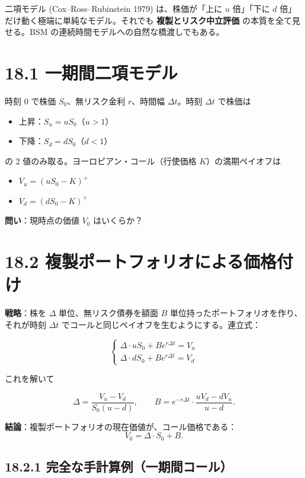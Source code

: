 \documentclass[11pt,a4paper]{report}
\begin{document}
二項モデル (Cox–Ross–Rubinstein 1979) は、株価が「上に $u$ 倍」「下に $d$ 倍」だけ動く極端に単純なモデル。それでも \textbf{複製とリスク中立評価} の本質を全て見せる。BSM の連続時間モデルへの自然な橋渡しでもある。

\section{18.1 一期間二項モデル}

時刻 0 で株価 $S_0$、無リスク金利 $r$、時間幅 $\Delta t$。時刻 $\Delta t$ で株価は

\begin{itemize}
\item 上昇：$S_u = u S_0$（$u > 1$）
\item 下降：$S_d = d S_0$（$d < 1$）
\end{itemize}

の 2 値のみ取る。ヨーロピアン・コール（行使価格 $K$）の満期ペイオフは

\begin{itemize}
\item $V_u = (u S_0 - K)^+$
\item $V_d = (d S_0 - K)^+$
\end{itemize}

\textbf{問い}：現時点の価値 $V_0$ はいくらか？

\section{18.2 複製ポートフォリオによる価格付け}

\textbf{戦略}：株を $\Delta$ 単位、無リスク債券を額面 $B$ 単位持ったポートフォリオを作り、それが時刻 $\Delta t$ でコールと同じペイオフを生むようにする。連立式：

\[ \begin{cases} \Delta \cdot u S_0 + B e^{r \Delta t} = V_u \\ \Delta \cdot d S_0 + B e^{r \Delta t} = V_d \end{cases} \]

これを解いて

\[ \Delta = \frac{V_u - V_d}{S_0 (u - d)}, \qquad B = e^{-r\Delta t} \cdot \frac{u V_d - d V_u}{u - d}. \]

\textbf{結論}：複製ポートフォリオの現在価値が、コール価格である： \[ V_0 = \Delta \cdot S_0 + B. \]

\subsection{18.2.1 完全な手計算例（一期間コール）}
\end{document}
